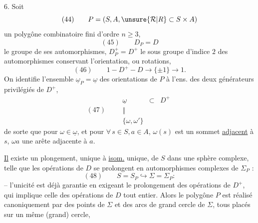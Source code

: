6. Soit
\[
(44)\qquad P=(S,A,\unsure{\mathcal R|R}\subset S\times A)
\]
un polygône combinatoire fini d'ordre $n\geq3$,
\[
(45)\qquad D_P=D
\]
le groupe de ses automorphismes, $D_P^+=D^+$ le sous groupe d'indice $2$ des automorphismes conservant l'orientation, ou rotations,
\[
(46)\qquad 1\mathbin{-}D^+\mathbin{-}D\longrightarrow\{\pm1\}\longrightarrow1.
\]
On identifie l'ensemble $\underline\omega_P=\underline\omega$ des orientations de $P$ à l'ens. des deux générateurs privilégiés de $D^+$, 
\[
(47)\qquad
\begin{array}{ccc}
\underline\omega&\subset&D^+\\
\Vert&&\\[-2pt]
\{\omega,\omega'\}&&
\end{array}
\]
de sorte que pour $\omega\in\underline\omega$, et pour $\forall\,s\in S,a\in A$, $\omega(s)$ est un sommet \uline{adjacent} à $s$, $\omega a$ une arête adjacente à $a$.

\uline{Il} existe un plongement, unique à \uline{isom.} unique,  de $S$ dans une sphère complexe,   telle que les opérations de $D$ se prolongent en automorphismes complexes de $\Sigma_P$ :
\[
(48)\qquad S=S_P\hookrightarrow\Sigma=\Sigma_P:
\]
-- l'unicité est déjà garantie en exigeant le prolongement des opérations de $D^+$, qui implique celle des opérations de $D$ tout entier. Alors le polygône $P$ est réalisé canoniquement par des points de $\Sigma$ et des arcs de grand cercle de $\Sigma$,  tous  placés sur un même (grand) cercle,
